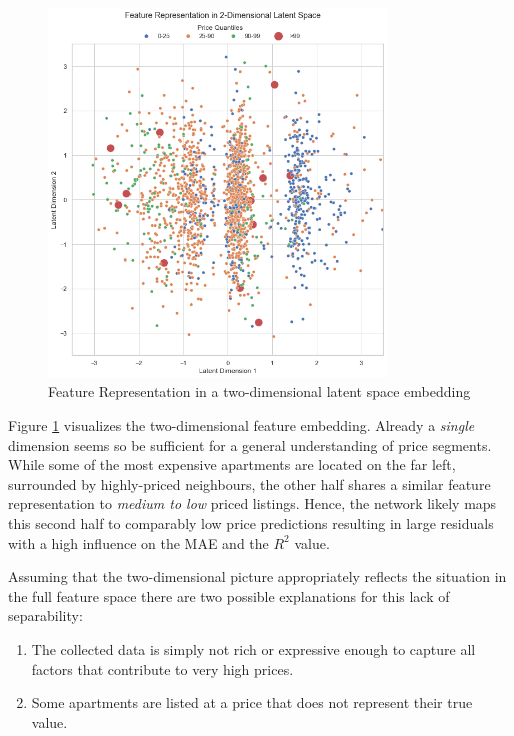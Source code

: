 \documentclass[12pt, letterpaper]{article}
\begin{document}
\begin{figure}[t]
    \centering
    \includegraphics[width=0.8\textwidth]{latent_representation.png}
    \caption{Feature Representation in a two-dimensional latent space embedding}
    \label{fig:latent-representation}
\end{figure}

Figure \ref{fig:latent-representation} visualizes the two-dimensional feature embedding.
Already a \emph{single} dimension seems so be sufficient for a general understanding of price segments.
While some of the most expensive apartments are located on the far left, surrounded by highly-priced neighbours, the other half shares a similar feature representation to \emph{medium to low} priced listings.
Hence, the network likely maps this second half to comparably low price predictions resulting in large residuals with a high influence on the MAE and the $R^2$ value.

Assuming that the two-dimensional picture appropriately reflects the situation in the full feature space there are two possible explanations for this lack of separability:
\begin{enumerate}
    \item The collected data is simply not rich or expressive enough to capture all factors that contribute to very high prices.
    \item Some apartments are listed at a price that does not represent their true value.
\end{enumerate}
\end{document}

